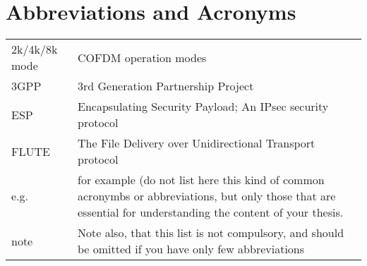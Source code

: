 
\chapter*{Abbreviations and Acronyms}


\noindent
\begin{longtable}{@{}p{}p{}@{}}
2k/4k/8k mode & COFDM operation modes \\
3GPP & 3rd Generation Partnership Project \\ 
ESP & Encapsulating Security Payload; An IPsec security protocol \\ 
FLUTE  & The File Delivery over Unidirectional Transport protocol \\ 
e.g.& for example (do not list here this kind of common acronymbs or abbreviations, but only those that are essential for understanding the content of your thesis. \\ 
note & Note also, that this list is not compulsory, and should be omitted if you have only few abbreviations

\end{longtable}
